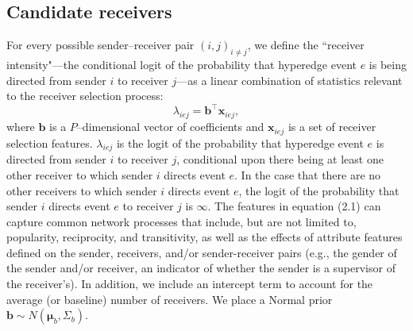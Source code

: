 \documentclass[ba]{imsart}
\numberwithin{equation}{section}
\theoremstyle{plain}
\begin{document}
	\subsection{Candidate receivers}\label{subsec: Tie}
	For every possible sender--receiver pair $(i,j)_{i \neq j}$, we define the ``receiver intensity"---the conditional logit of the probability that hyperedge event $e$ is being directed from sender $i$ to receiver $j$---as a linear combination of statistics relevant to the receiver selection process:
	\begin{equation}
		\lambda_{iej} = {\boldsymbol{b}}^{\top}\boldsymbol{x}_{iej},
	\end{equation}
	where $\boldsymbol{b}$ is a $P$--dimensional vector of coefficients and $\boldsymbol{x}_{iej}$ is a set of receiver selection features. $\lambda_{iej}$ is the logit of the probability that hyperedge event $e$ is directed from sender $i$ to receiver $j$, conditional upon there being at least one other receiver to which sender $i$ directs event $e$. In the case that there are no other receivers to which sender $i$ directs event $e$, the logit of the probability that sender $i$ directs event $e$ to receiver $j$ is $\infty$. The features in equation (2.1) can capture common network processes that include, but are not limited to, popularity, reciprocity, and transitivity, as well as the effects of attribute features defined on the sender, receivers, and/or sender-receiver pairs (e.g., the gender of the sender and/or receiver, an indicator of whether the sender is a supervisor of the receiver's). In addition, we include an intercept term to account for the average (or baseline) number of receivers. We place a Normal prior $\boldsymbol{b} \sim N(\boldsymbol{\mu}_b, \Sigma_b)$.
	
\end{document}
